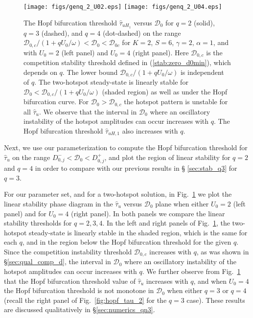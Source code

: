 \documentclass{article}%
\begin{document}
\begin{figure}[htbp]
\centering
\texttt{[image: figs/genq\_2\_U02.eps]}
\texttt{[image: figs/genq\_2\_U04.eps]}
\caption{\label{fig:genq::hopf_tau_2} The Hopf bifurcation
  threshold $\hat{\tau}_{uH_1}$ versus ${\mathcal D}_0$ for $q=2$
  (solid), $q=3$ (dashed), and $q=4$ (dot-dashed) on the range
  ${{\mathcal D}_{0,c}/(1+{qU_0/\omega})}<{\mathcal D}_0<{\mathcal
    D}_{0c}$ for $K=2$, $S=6$, $\gamma=2$, $\alpha=1$, and with
  $U_0=2$ (left panel) and $U_0=4$ (right panel). Here ${\mathcal
    D}_{0,c}$ is the competition stability threshold defined in
  (\ref{stab:zero_d0min}), which depends on $q$. The lower bound
  ${{\mathcal D}_{0,c}/(1+{qU_0/\omega})}$ is independent of $q$. The
  two-hotspot steady-state is linearly stable for ${\mathcal
    D}_0<{{\mathcal D}_{0,c}/(1+{qU_0/\omega})}$ (shaded region) as
  well as under the Hopf bifurcation curve. For ${\mathcal
    D}_0>{\mathcal D}_{0,c}$ the hotspot pattern is unstable for all
  $\hat{\tau}_u$. We observe that the interval in ${\mathcal D}_0$
  where an oscillatory instability of the hotspot amplitudes can occur
  increases with $q$. The Hopf bifurcation threshold
  $\hat{\tau}_{uH,1}$ also increases with $q$.}
\end{figure}

Next, we use our parameterization to compute the Hopf bifurcation
threshold for $\hat{\tau}_u$ on the range $D^{-}_{0,j}<{\mathcal
  D}_0<D^{+}_{0,j}$, and plot the region of linear stability for $q=2$
and $q=4$ in order to compare with our previous results in \S
\ref{sec:stab_q3} for $q=3$.

For our parameter set, and for a two-hotspot solution, in
Fig.~\ref{fig:genq::hopf_tau_2} we plot the linear stability phase
diagram in the $\hat{\tau}_u$ versus ${\mathcal D}_0$ plane when
either $U_0=2$ (left panel) and for $U_0=4$ (right panel). In both
panels we compare the linear stability thresholds for $q=2,3,4$. In
the left and right panels of Fig.~\ref{fig:genq::hopf_tau_2}, the
two-hotspot steady-state is linearly stable in the shaded region,
which is the same for each $q$, and in the region below the Hopf
bifurcation threshold for the given $q$. Since the competition
instability threshold ${\mathcal D}_{0,c}$ increases with $q$, as was
shown in \S \ref{sec:qual_comp_d}, the interval in ${\mathcal D}_0$
where an oscillatory instability of the hotspot amplitudes can occur
increases with $q$. We further observe from
Fig.~\ref{fig:genq::hopf_tau_2} that the Hopf bifurcation threshold
value of $\hat{\tau}_u$ increases with $q$, and when $U_0=4$ the Hopf
bifurcation threshold is not monotone in ${\mathcal D}_0$ when either
$q=3$ or $q=4$ (recall the right panel of Fig.~\ref{fig:hopf_tau_2}
for the $q=3$ case). These results are discussed qualitatively in
\S \ref{sec:numerics_qn3}.
\end{document}
